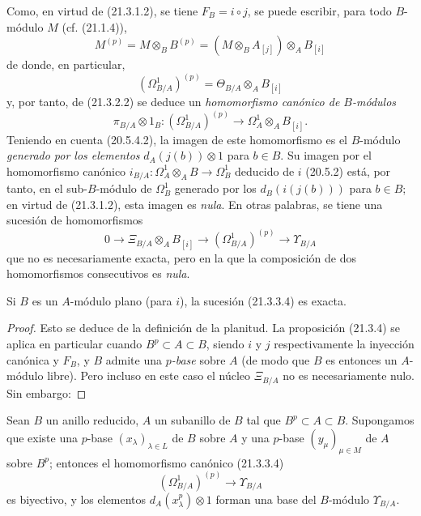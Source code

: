 \begin{env}[21.3.3]
\label{0.21.3.3-fr}
Como, en virtud de (21.3.1.2), se tiene $F_B=i\circ j$, se puede escribir,
para todo $B$-módulo $M$ (cf. (21.1.4)),
\begin{equation}
\tag{21.3.3.1}\label{0.21.3.3.1-fr}
M^{(p)}=M\otimes_B B^{(p)}=(M\otimes_B A_{[j]})\otimes_A B_{[i]}
\end{equation}
de donde, en particular,
\begin{equation}
\tag{21.3.3.2}\label{0.21.3.3.2-fr}
(\Omega^1_{B/A})^{(p)}=\Theta_{B/A}\otimes_A B_{[i]}
\end{equation}
y, por tanto, de (21.3.2.2) se deduce un \emph{homomorfismo canónico de
$B$-módulos}
\begin{equation}
\tag{21.3.3.3}\label{0.21.3.3.3-fr}
\pi_{B/A}\otimes1_B:(\Omega^1_{B/A})^{(p)}\longrightarrow
\Omega^1_A\otimes_A B_{[i]}.
\end{equation}
Teniendo en cuenta (20.5.4.2), la imagen de este homomorfismo es el $B$-módulo
\emph{generado por los elementos} $d_A(j(b))\otimes1$ para $b\in B$. Su imagen por
el homomorfismo canónico $i_{B/A}:\Omega^1_A\otimes_A B\to\Omega^1_B$
deducido de $i$ (20.5.2) está, por tanto, en el sub-$B$-módulo de
$\Omega^1_B$ generado por los $d_B(i(j(b)))$ para $b\in B$; en virtud de
(21.3.1.2), esta imagen es \emph{nula}. En otras palabras, se tiene una sucesión de
homomorfismos
\begin{equation}
\tag{21.3.3.4}\label{0.21.3.3.4-fr}
0\to\Xi_{B/A}\otimes_A B_{[i]}\to(\Omega^1_{B/A})^{(p)}
\to\Upsilon_{B/A}
\end{equation}
que no es necesariamente exacta, pero en la que la composición de dos
homomorfismos consecutivos es \emph{nula}.
\end{env}

\begin{proposition}[21.3.4]
\label{0.21.3.4-fr}
Si $B$ es un $A$-módulo plano (para $i$), la sucesión (21.3.3.4) es exacta.
\end{proposition}
\begin{proof}
Esto se deduce de la definición de la planitud. La proposición (21.3.4) se aplica en
particular cuando $B^p\subset A\subset B$, siendo $i$ y $j$ respectivamente
la inyección canónica y $F_B$, y $B$ admite una \emph{$p$-base} sobre $A$ (de modo
que $B$ es entonces un $A$-módulo libre). Pero incluso en este caso el núcleo
$\Xi_{B/A}$ no es necesariamente nulo. Sin embargo:
\end{proof}

\begin{proposition}[21.3.5]
\label{0.21.3.5-fr}
Sean $B$ un anillo reducido, $A$ un subanillo de $B$ tal que
$B^p\subset A\subset B$. Supongamos que existe una $p$-base
$(x_\lambda)_{\lambda\in L}$ de $B$ sobre $A$ y una $p$-base
$(y_\mu)_{\mu\in M}$ de $A$ sobre $B^p$; entonces el homomorfismo canónico
(21.3.3.4)
\begin{equation}
\tag{21.3.5.1}\label{0.21.3.5.1-fr}
(\Omega^1_{B/A})^{(p)}\longrightarrow\Upsilon_{B/A}
\end{equation}
es biyectivo, y los elementos $d_A(x_\lambda^p)\otimes1$ forman una base del
$B$-módulo $\Upsilon_{B/A}$.
\end{proposition}


